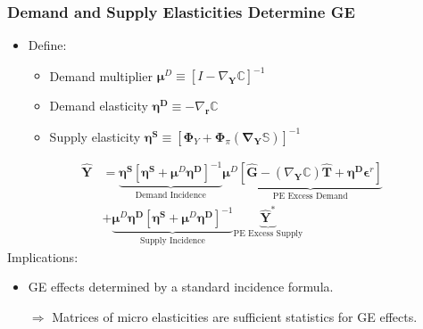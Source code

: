 \documentclass[english,xcolor=svgnames]{beamer}
\begin{document}
\begin{frame}
    \frametitle{Demand and Supply Elasticities Determine GE}
    \begin{itemize}
        \item Define:
        \begin{itemize}
            \item Demand multiplier $\bm{\mu}^D \equiv [I - \nabla_{\bm{Y}}\pmb{\mathbb{C}}]^{-1}$
            \item Demand elasticity $\bm{\eta^D} \equiv -\nabla_{\bm{r}}\pmb{\mathbb{C}}$
            \item Supply elasticity $\bm{\eta^S} \equiv [ \bm{\Phi}_Y  +  \bm{\Phi}_\pi (\pmb{\nabla_{\bm{Y}}\pmb{\mathbb{S}}}) ]^{-1}$
        \end{itemize}
    \end{itemize}
    \begin{align*}
        \bm{\hat{Y}} &=  \underbrace{\bm{\eta^S} [ \bm{\eta^S} + \bm{\mu}^D\bm{\eta^D}  ]^{-1}}_{\text{Demand Incidence}}  \bm{\mu}^D  \underbrace{[\bm{\hat{G}} - (\nabla_{\bm{Y}}\pmb{\mathbb{C}})\bm{\hat{T}} + \bm{\eta^D}\bm{\epsilon}^r ]}_{\text{PE Excess Demand}}  \\
        & + \underbrace{\bm{\mu}^D\bm{\eta^D} [ \bm{\eta^S} + \bm{\mu}^D\bm{\eta^D}  ]^{-1}  }_{\text{Supply Incidence}}   \underbrace{\bm{\hat{Y}}^*}_{\text{PE Excess Supply}}  
    \end{align*}
    Implications:
    \begin{itemize}
        \item GE effects determined by a standard incidence formula.  
        \item[$\Rightarrow$] Matrices of micro elasticities are sufficient statistics for GE effects. 
    \end{itemize}
\end{frame}
\end{document}
